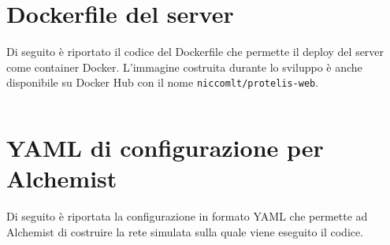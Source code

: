 \addpart*{\appendixname}



\appendix
\begin{appendices}

  \chapter{Dockerfile del server}\label{app:docker}

    Di seguito è riportato il codice del Dockerfile che permette il deploy del server come container Docker.
    L'immagine costruita durante lo sviluppo è anche disponibile su Docker Hub con il nome \texttt{niccomlt/protelis-web}.

    \inputminted{dockerfile}{res/code/Dockerfile}

  \chapter{YAML di configurazione per Alchemist}\label{app:yaml}

    Di seguito è riportata la configurazione in formato YAML che permette ad Alchemist di costruire la rete simulata sulla quale viene eseguito il codice.

    \inputminted{yaml}{res/code/simulation.yml}

\end{appendices}
